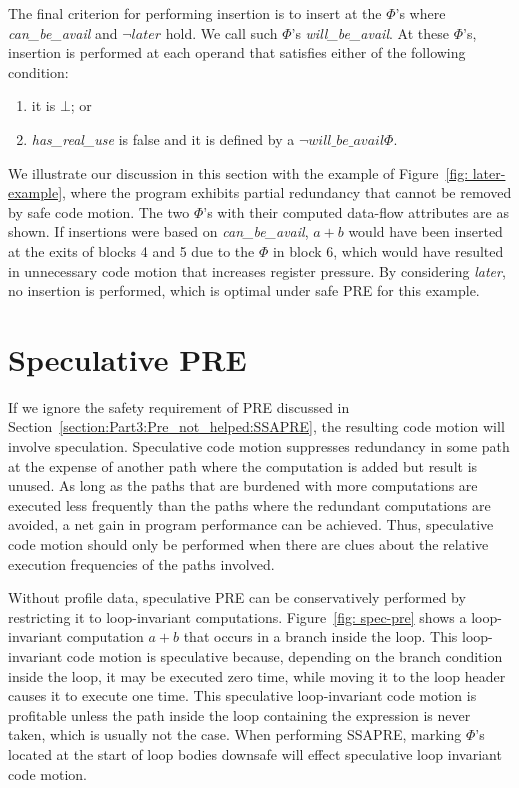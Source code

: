 The final criterion for performing insertion is to insert at the $\Phi$'s where 
\emph{can\_be\_avail} and $\neg later$ hold.  We call such $\Phi$'s
\emph{will\_be\_avail}.  At these $\Phi$'s,
insertion is performed at each operand that satisfies either of the following
condition:
\begin{enumerate}
\item it is $\bot$; or
\item \emph{has\_real\_use} is false and it is defined by a 
$\neg will\_be\_avail \Phi$.
\end{enumerate}

We illustrate our discussion in this section with the example of 
Figure~\ref{fig: later-example}, where the program exhibits partial redundancy
that cannot be removed by safe code motion.  The two $\Phi$'s with their 
computed data-flow attributes are as shown.  If insertions were based on
\emph{can\_be\_avail}, $a+b$ would have been inserted at the exits of 
blocks 4 and 5 due to the $\Phi$ in block 6,
which would have resulted in unnecessary code motion that increases
register pressure.  By considering \emph{later}, no insertion is performed,
which is optimal under safe PRE for this example.
 
\section{Speculative PRE}

If we ignore the safety requirement of PRE discussed in 
Section~\ref{section:Part3:Pre_not_helped:SSAPRE}, the resulting code motion
will involve speculation.  Speculative code motion suppresses
redundancy in some path at the expense of another path where the computation 
is added but result is unused.  As long as the paths that are burdened with
more computations are executed less frequently than the paths where the
redundant computations are avoided, a net gain in program performance can be
achieved.  Thus, speculative code motion should only be performed when there
are clues about the relative execution frequencies of the paths involved.

Without profile data, speculative PRE can be conservatively performed by
restricting it to loop-invariant computations.  
Figure~\ref{fig: spec-pre} shows
a loop-invariant computation $a+b$ that occurs in a branch inside the loop.
This loop-invariant code motion is speculative because, depending on the
branch condition inside the loop, it may be executed zero time, while moving it
to the loop header causes it to execute one time. This speculative 
loop-invariant code motion is profitable unless the path inside the loop
containing the expression is never taken, which is usually not the case.
When performing SSAPRE, marking $\Phi$'s located at the start of loop bodies
downsafe will effect speculative loop invariant code motion. 

